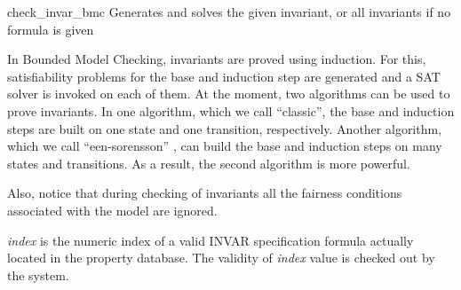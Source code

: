 \begin{nusmvCommand}{check\_invar\_bmc}{\label{checkInvarBmcCommand}
Generates and solves the given invariant, or all invariants if no
 formula is given}
 

In Bounded Model Checking, invariants are proved using induction. For
this, satisfiability problems for the base and induction step are
generated and a SAT solver is invoked on each of them. At the moment,
two algorithms can be used to prove invariants. In one algorithm,
which we call ``classic'', the base and induction steps are built on
one state and one transition, respectively.  Another algorithm, which
we call ``een-sorensson'' \cite{een04temporal}, can build the base and
induction steps on many states and transitions. As a result, the
second algorithm is more powerful.

Also, notice that during checking of invariants all the fairness
conditions associated with the model are ignored.

\begin{cmdOpt}

 { {\it index} is the numeric
index of a valid INVAR specification formula actually located in the
property database.  The validity of {\it index} value is checked out
by the system.}
       
            



\end{cmdOpt}

\end{nusmvCommand}
